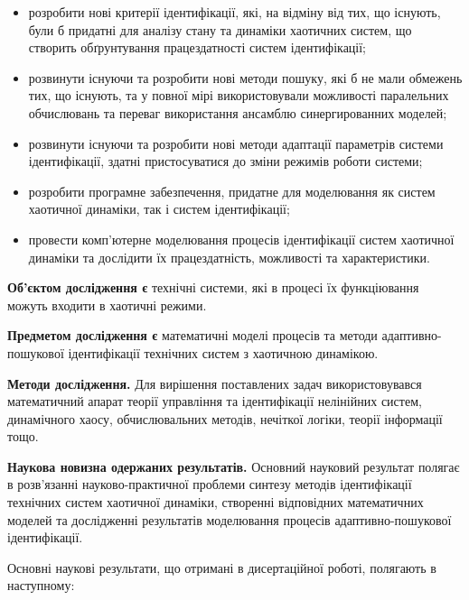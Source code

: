 \documentclass[a4paper,13pt]{atuaref}
\begin{document}
\begin{itemize}

  \item
  розробити нові критерії ідентифікації, які, на відміну від тих, що
  існують, були б придатні для аналізу стану та динаміки
  хаотичних систем, що створить обґрунтування працездатності систем
  ідентифікації;

  \item
  розвинути існуючи та розробити нові методи пошуку, які б не мали
  обмежень тих, що існують, та у повної мірі використовували можливості
  паралельних обчислювань та переваг використання ансамблю
  синергированних моделей;

  \item
  розвинути існуючи та розробити нові методи адаптації параметрів
  системи ідентифікації, здатні пристосуватися до зміни режимів роботи
  системи;

  \item
  розробити програмне забезпечення, придатне для моделювання як систем
  хаотичної динаміки, так і систем ідентифікації;

  \item
  провести комп'ютерне моделювання процесів ідентифікації систем
  хаотичної динаміки та дослідити їх працездатність, можливості та
  характеристики.

\end{itemize}


\textbf{Об'єктом дослідження є}
технічні системи, які в процесі їх функціювання можуть
входити в хаотичні режими.

\smallskip
\textbf{Предметом дослідження є}
математичні моделі процесів та методи
адаптивно-пошукової ідентифікації технічних систем з хаотичною динамікою.

\smallskip
\textbf{Методи дослідження.}
Для вирішення поставлених задач використовувався математичний апарат
теорії управління та ідентифікації нелінійних систем, динамічного хаосу,
обчислювальних методів, нечіткої логіки, теорії інформації тощо.

\smallskip
\textbf{Наукова новизна одержаних результатів.}
Основний науковий результат полягає в розв'язанні науково-практичної проблеми
синтезу методів ідентифікації
технічних систем хаотичної динаміки, створенні відповідних математичних
моделей та дослідженні результатів моделювання процесів
адаптивно-пошукової ідентифікації.

Основні наукові результати, що отримані в дисертаційної роботі, полягають
в наступному:
\end{document}
